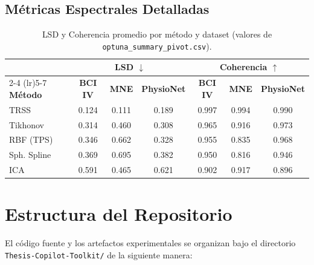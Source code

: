 \section{Métricas Espectrales Detalladas}

\begin{table}[ht]
\centering
\caption{LSD y Coherencia promedio por método y dataset (valores de \texttt{optuna\_summary\_pivot.csv}).}
\label{tab:spectral_detail}
\begin{tabular}{lcccccc}
\toprule
& \multicolumn{3}{c}{\textbf{LSD} $\downarrow$} & \multicolumn{3}{c}{\textbf{Coherencia} $\uparrow$} \\
\cmidrule(lr){2-4} \cmidrule(lr){5-7}
\textbf{Método} & \textbf{BCI IV} & \textbf{MNE} & \textbf{PhysioNet} & \textbf{BCI IV} & \textbf{MNE} & \textbf{PhysioNet} \\
\midrule
TRSS         & 0.124 & 0.111 & 0.189 & 0.997 & 0.994 & 0.990 \\
Tikhonov     & 0.314 & 0.460 & 0.308 & 0.965 & 0.916 & 0.973 \\
RBF (TPS)    & 0.346 & 0.662 & 0.328 & 0.955 & 0.835 & 0.968 \\
Sph. Spline  & 0.369 & 0.695 & 0.382 & 0.950 & 0.816 & 0.946 \\
ICA          & 0.591 & 0.465 & 0.621 & 0.902 & 0.917 & 0.896 \\
\bottomrule
\end{tabular}
\end{table}

\chapter{Estructura del Repositorio}

El código fuente y los artefactos experimentales se organizan bajo el directorio \texttt{Thesis-Copilot-Toolkit/} de la siguiente manera:

